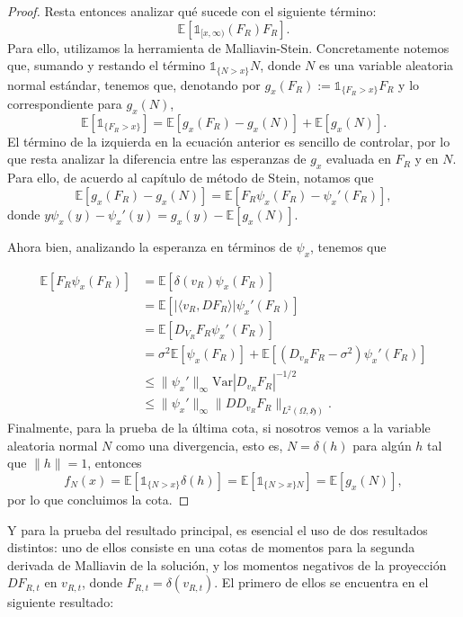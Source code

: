 \documentclass[letterpaper,twoside,12pt]{book}
\newcommand{\E}{\mathbb{E}}
\newcommand{\1}{\mathds{1}}
\newcommand{\abs}[1]{\left\lvert #1 \right\rvert}
\theoremstyle{definition}
\theoremstyle{definition}
\theoremstyle{definition}
\theoremstyle{definition}
\theoremstyle{definition}
\theoremstyle{definition}
\theoremstyle{definition}
\begin{document}
\begin{proof}
   Resta entonces analizar qué sucede con el siguiente término:
   \[
    \E\left[\1_{[x,\infty)}(F_R)F_R\right].
   \]
   Para ello, utilizamos la herramienta de Malliavin-Stein. Concretamente notemos que, sumando y restando el término $\1_{\{N>x\}}N$, donde $N$ es una variable aleatoria normal estándar, tenemos que, denotando por $g_x(F_R):=\1_{\{F_R>x\}}F_R$ y lo correspondiente para $g_x(N)$, 
   \[
    \E\left[\1_{\{F_R>x\}}\right]=\E\left[g_x(F_R)-g_x(N)\right]+\E\left[g_x(N)\right].
   \]
   El término de la izquierda en la ecuación anterior es sencillo de controlar, por lo que resta analizar la diferencia entre las esperanzas de $g_x$ evaluada en $F_R$ y en $N$. Para ello, de acuerdo al capítulo de método de Stein, notamos que 
   \[
   \E\left[g_x(F_R)-g_x(N)\right]=\E\left[F_R\psi_x(F_R)-\psi_x'(F_R)\right], 
   \]
   donde $y\psi_x(y)-\psi_x'(y)=g_x(y)-\E\left[g_x(N)\right]$.

   Ahora bien, analizando la esperanza en términos de $\psi_x$, tenemos que 
   
   \begin{align*}
    \E\left[F_R\psi_x(F_R)\right]&=\E\left[\delta(v_R)\psi_x(F_R)\right]\\
    &=\E\left[\abs{\langle v_R,DF_R\rangle}\psi_x'(F_R)\right]\\
    &=\E\left[D_{V_R}F_R\psi_x'(F_R)\right]\\
    &=\sigma^2 \E\left[\psi_x(F_R)\right]+\E\left[\left(D_{v_R}F_R-\sigma^2\right)\psi_x'(F_R)\right]\\
    &\le \|\psi_x'\|_\infty \text{Var}\abs{D_{v_R}F_R}^{-1/2}\\
    &\leq \|\psi_x'\|_\infty \|DD_{v_R}F_R\|_{L^2(\Omega,\mathfrak{H})}.
   \end{align*}
   Finalmente, para la prueba de la última cota, si nosotros vemos a la variable aleatoria normal $N$ como una divergencia, esto es, $N=\delta(h)$ para algún $h$ tal que $\|h\|=1$, entonces 
   \[
    f_N(x)=\E\left[\1_{\{N>x\}}\delta(h)\right]=\E\left[\1_{\{N>x\}N}\right]=\E\left[g_x(N)\right],
   \]
   por lo que concluimos la cota.
 \end{proof}

Y para la prueba del resultado principal, es esencial el uso de dos resultados distintos: uno de ellos consiste en una cotas de momentos para la segunda derivada de Malliavin de la solución, y los momentos negativos de la proyección $DF_{R,t}$ en $v_{R,t}$, donde $F_{R,t}=\delta(v_{R,t})$. El primero de ellos se encuentra en el siguiente resultado:
\end{document}
